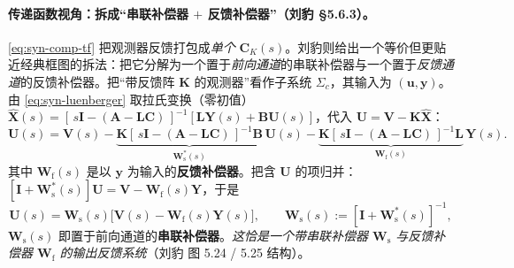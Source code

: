 \paragraph{传递函数视角：拆成“串联补偿器 $+$ 反馈补偿器”（刘豹 §5.6.3）。}
\cref{eq:syn-comp-tf} 把观测器反馈打包成\emph{单个} $\mathbf C_K(s)$。刘豹则给出一个等价但更贴近经典框图的拆法：把它分解为一个置于\emph{前向通道}的串联补偿器与一个置于\emph{反馈通道}的反馈补偿器\cite{liubao2006modern}。把“带反馈阵 $\mathbf K$ 的观测器”看作子系统 $\Sigma_c$，其输入为 $(\mathbf u,\mathbf y)$。由 \cref{eq:syn-luenberger} 取拉氏变换（零初值）$\hat{\mathbf X}(s)=[\,s\mathbf I-(\mathbf A-\mathbf L\mathbf C)\,]^{-1}[\mathbf L\mathbf Y(s)+\mathbf B\mathbf U(s)]$，代入 $\mathbf U=\mathbf V-\mathbf K\hat{\mathbf X}$：
\begin{equation}
  \mathbf U(s)=\mathbf V(s)-\underbrace{\mathbf K[\,s\mathbf I-(\mathbf A-\mathbf L\mathbf C)\,]^{-1}\mathbf B}_{\textstyle \mathbf W_{\mathrm s}^{*}(s)}\,\mathbf U(s)-\underbrace{\mathbf K[\,s\mathbf I-(\mathbf A-\mathbf L\mathbf C)\,]^{-1}\mathbf L}_{\textstyle \mathbf W_{\mathrm f}(s)}\,\mathbf Y(s).
  \label{eq:syn-comp-collect}
\end{equation}
其中 $\mathbf W_{\mathrm f}(s)$ 是以 $\mathbf y$ 为输入的\textbf{反馈补偿器}。把含 $\mathbf U$ 的项归并：$[\mathbf I+\mathbf W_{\mathrm s}^{*}(s)]\mathbf U=\mathbf V-\mathbf W_{\mathrm f}(s)\mathbf Y$，于是
\begin{equation}
  \mathbf U(s)=\mathbf W_{\mathrm s}(s)\big[\mathbf V(s)-\mathbf W_{\mathrm f}(s)\mathbf Y(s)\big],\qquad \mathbf W_{\mathrm s}(s):=[\mathbf I+\mathbf W_{\mathrm s}^{*}(s)]^{-1},
  \label{eq:syn-comp-Ws-def}
\end{equation}
$\mathbf W_{\mathrm s}(s)$ 即置于前向通道的\textbf{串联补偿器}。\emph{这恰是一个带串联补偿器 $\mathbf W_{\mathrm s}$ 与反馈补偿器 $\mathbf W_{\mathrm f}$ 的输出反馈系统}（刘豹 图 5.24 / 5.25 结构）。

